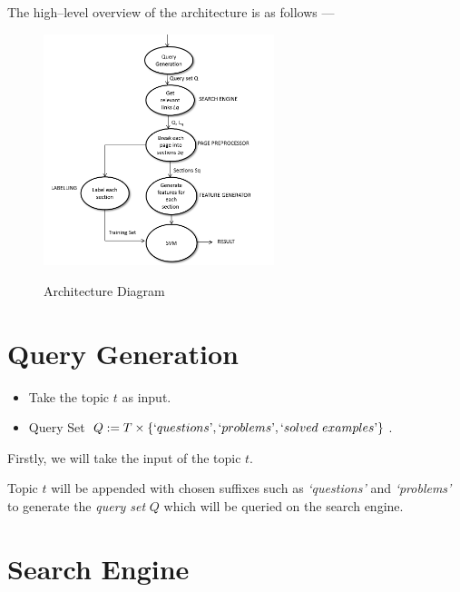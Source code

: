 \documentclass[a4paper,10pt]{report}
\begin{document}
\noindent The high--level overview of the architecture is as follows ---
\begin{figure}[h!]
\centering
\includegraphics[width=0.6\textwidth]{./diagrams/architecture}\\
\caption{Architecture Diagram}
\end{figure}
\clearpage

\section{Query Generation}

\begin{itemize}

	\item Take the topic $t$ as input.
	\item Query Set $Q := T \times \{`questions\textrm', `problems\textrm', `solved\ examples\textrm'\}$.
\end{itemize} 

\noindent Firstly, we will take the input of the topic $t$.

Topic $t$ will be appended with chosen suffixes such as \emph{`questions'} and \emph{`problems'} to generate the \emph{query set} $Q$ which will be queried on the search engine.

\section{Search Engine}
\end{document}
